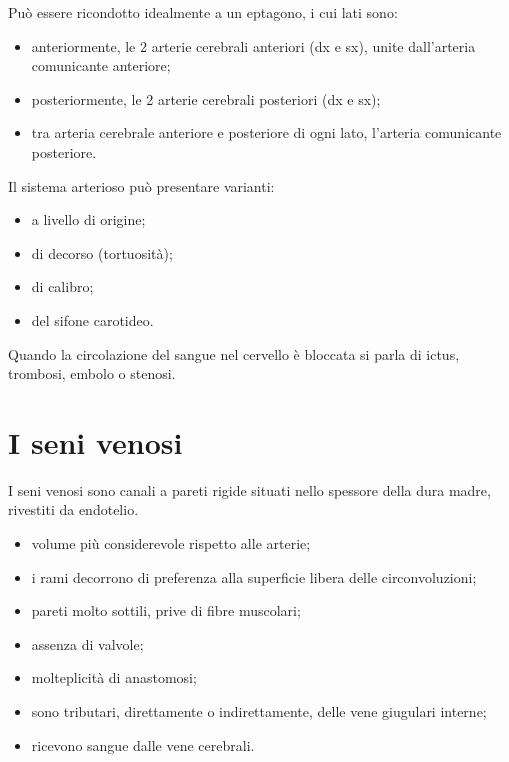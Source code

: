 Può essere ricondotto idealmente a un eptagono, i cui lati sono:
\begin{itemize}
  \item anteriormente, le 2 arterie cerebrali anteriori (dx e sx), unite
    dall'arteria comunicante anteriore;
  \item posteriormente, le 2 arterie cerebrali posteriori (dx e sx);
  \item tra arteria cerebrale anteriore e posteriore di ogni lato, l'arteria
    comunicante posteriore.
\end{itemize}

Il sistema arterioso può presentare varianti:
\begin{itemize}
  \item a livello di origine;
  \item di decorso (tortuosità);
  \item di calibro;
  \item del sifone carotideo.
\end{itemize}

Quando la circolazione del sangue nel cervello è bloccata si parla di ictus,
trombosi, embolo o stenosi.

\section{I seni venosi}

I seni venosi sono canali a pareti rigide situati nello spessore della dura
madre, rivestiti da endotelio.

\begin{itemize}
  \item volume più considerevole rispetto alle arterie;
  \item i rami decorrono di preferenza alla superficie libera delle
    circonvoluzioni;
  \item pareti molto sottili, prive di fibre muscolari;
  \item assenza di valvole;
  \item molteplicità di anastomosi;
  \item sono tributari, direttamente o indirettamente, delle vene giugulari
    interne;
  \item ricevono sangue dalle vene cerebrali.
\end{itemize}

